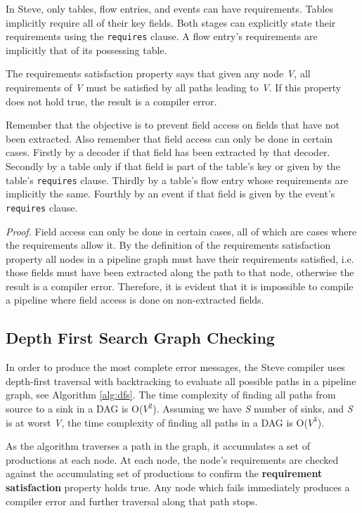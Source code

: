 In Steve, only tables, flow entries, and events can have requirements. Tables implicitly require all of their key fields. Both stages can explicitly state their requirements using the \texttt{\color{blue}requires} clause. A flow entry's requirements are implicitly that of its possessing table.

The requirements satisfaction property says that given any node \textit{V}, all requirements of \textit{V} must be satisfied by all paths leading to \textit{V}. If this property does not hold true, the result is a compiler error.

Remember that the objective is to prevent field access on fields that have not been extracted. Also remember that field access can only be done in certain cases. Firstly by a decoder if that field has been extracted by that decoder. Secondly by a table only if that field is part of the table's key or given by the table's \texttt{\color{blue}requires} clause. Thirdly by a table's flow entry whose requirements are implicitly the same. Fourthly by an event if that field is given by the event's \texttt{\color{blue}requires} clause.

\textit{Proof.} Field access can only be done in certain cases, all of which are cases where the requirements allow it. By the definition of the requirements satisfaction property all nodes in a pipeline graph must have their requirements satisfied, i.e. those fields must have been extracted along the path to that node, otherwise the result is a compiler error. Therefore, it is evident that it is impossible to compile a pipeline where field access is done on non-extracted fields.

\subsection{Depth First Search Graph Checking} \label{guide:dfs_desc}

In order to produce the most complete error messages, the Steve compiler uses depth-first traversal with backtracking to evaluate all possible paths in a pipeline graph, see Algorithm \ref{alg:dfs}. The time complexity of finding all paths from source to a sink in a DAG is O($V^2$). Assuming we have \textit{S} number of sinks, and \textit{S} is at worst \textit{V}, the time complexity of finding all paths in a DAG is O($V^3$).

As the algorithm traverses a path in the graph, it accumulates a set of productions at each node. At each node, the node's requirements are checked against the accumulating set of productions to confirm the \textbf{requirement satisfaction} property holds true. Any node which fails immediately produces a compiler error and further traversal along that path stops.

